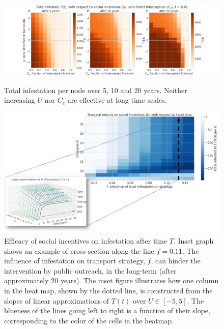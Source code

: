 \begin{figure}[!h]
 \centering
\includegraphics[width  =\textwidth]{chapter_2/ct_v_ce_plane.png}
\caption[Total infestation per node over 5, 10 and 20 years.]{Total infestation per node over 5, 10 and 20 years. Neither increasing $U$ nor $C_e$ are effective at long time scales.}
\protect \label{ct_v_ce}
\end{figure}



\begin{figure}[!h]
    \centering
    \includegraphics[width = \textwidth]{chapter_2/p1.jpg}
    \caption[Efficacy of social incentives on infestation after time $T$. Inset graph shows an example of cross-section along the line $f = 0.11$.]{Efficacy of social incentives on infestation after time $T$. Inset graph shows an example of cross-section along the line $f = 0.11$. The influence of infestation on transport strategy, $f$, can hinder the intervention by public outreach, in the long-term (after approximately 20 years). The inset figure illustrates how one column in the heat map, shown by the dotted line, is constructed from the slopes of linear approximations of $T(t)$ over $U\in [-5,5]$. The blueness of the lines going left to right is a function of their slope, corresponding to the color of the cells in the heatmap.}
    \label{effectiveness_inset}
\end{figure}

